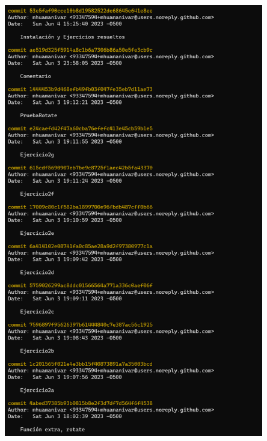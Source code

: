 \documentclass{article}
\begin{document}
\begin{minipage}{\linewidth}
  \centering
  \includegraphics[width=0.85\textwidth]{imagenes/commits2.png}
\end{minipage}

\pagebreak
\end{document}
